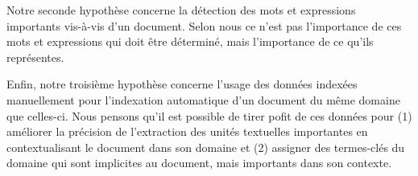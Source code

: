     Notre seconde hypothèse concerne la détection des mots et expressions
    importants vis-à-vis d'un document. Selon nous ce n'est pas l'importance de
    ces mots et expressions qui doit être déterminé, mais l'importance de ce
    qu'ils représentes. 
    
    Enfin, notre troisième hypothèse concerne l'usage des données indexées
    manuellement pour l'indexation automatique d'un document du même domaine que
    celles-ci. Nous pensons qu'il est possible de tirer pofit de ces données
    pour (1) améliorer la précision de l'extraction des unités textuelles importantes en
    contextualisant le document dans son domaine et (2) assigner des termes-clés
    du domaine qui sont implicites au document, mais importants dans son
    contexte. 


